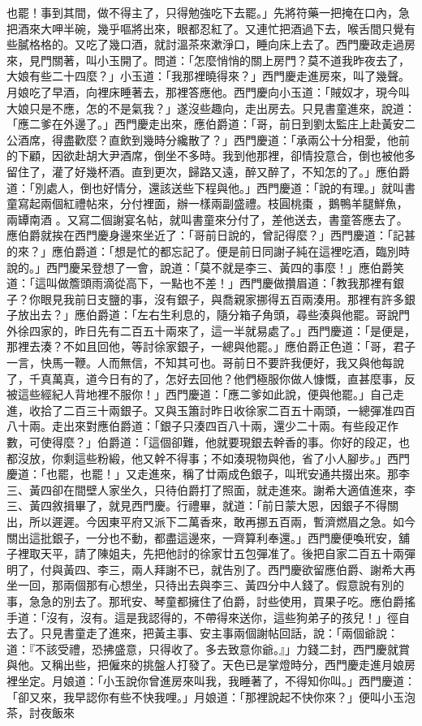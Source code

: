 \begin{showcontents}{}
也罷！事到其間，做不得主了，只得勉強吃下去罷。」先將符藥一把掩在口內，急把酒來大呷半碗，幾乎嘔將出來，眼都忍紅了。又連忙把酒過下去，喉舌間只覺有些膩格格的。又吃了幾口酒，就討溫茶來漱淨口，睡向床上去了。西門慶政走過房來，見門關著，叫小玉開了。問道：「怎麼悄悄的關上房門？莫不道我昨夜去了，大娘有些二十四麼？」小玉道：「我那裡曉得來？」西門慶走進房來，叫了幾聲。月娘吃了早酒，向裡床睡著去，那裡答應他。西門慶向小玉道：「賊奴才，現今叫大娘只是不應，怎的不是氣我？」遂沒些趣向，走出房去。只見書童進來，說道：「應二爹在外邊了。」西門慶走出來，應伯爵道：「哥，前日到劉太監庄上赴黃安二公酒席，得盡歡麼？直飲到幾時分纔散了？」西門慶道：「承兩公十分相愛，他前的下顧，因欲赴胡大尹酒席，倒坐不多時。我到他那裡，卻情投意合，倒也被他多留住了，灌了好幾杯酒。直到更次，歸路又遠，醉又醉了，不知怎的了。」應伯爵道：「別處人，倒也好情分，還該送些下程與他。」西門慶道：「說的有理。」就叫書童寫起兩個紅禮帖來，分付裡面，辦一樣兩副盛禮。枝圓桃棗 ，鵝鴨羊腿鮮魚，兩罈南酒 。又寫二個謝宴名帖，就叫書童來分付了，差他送去，書童答應去了。應伯爵就挨在西門慶身邊來坐近了：「哥前日說的，曾記得麼？」西門慶道：「記甚的來？」應伯爵道：「想是忙的都忘記了。便是前日同謝子純在這裡吃酒，臨別時說的。」西門慶呆登想了一會，說道：「莫不就是李三、黃四的事麼！」應伯爵笑道：「這叫做簷頭雨滴從高下，一點也不差！」西門慶做攢眉道：「教我那裡有銀子？你眼見我前日支鹽的事，沒有銀子，與喬親家挪得五百兩湊用。那裡有許多銀子放出去？」應伯爵道：「左右生利息的，隨分箱子角頭，尋些湊與他罷。哥說門外徐四家的，昨日先有二百五十兩來了，這一半就易處了。」西門慶道：「是便是，那裡去湊？不如且回他，等討徐家銀子，一總與他罷。」應伯爵正色道：「哥，君子一言，快馬一鞭。人而無信，不知其可也。哥前日不要許我便好，我又與他每說了，千真萬真，道今日有的了，怎好去回他？他們極服你做人慷慨，直甚麼事，反被這些經紀人背地裡不服你！」西門慶道：「應二爹如此說，便與他罷。」自己走進，收拾了二百三十兩銀子。又與玉簫討昨日收徐家二百五十兩頭，一總彈准四百八十兩。走出來對應伯爵道：「銀子只湊四百八十兩，還少二十兩。有些段疋作數，可使得麼？」伯爵道：「這個卻難，他就要現銀去幹香的事。你好的段疋，也都沒放，你剩這些粉緞，他又幹不得事；不如湊現物與他，省了小人腳步。」西門慶道：「也罷，也罷！」又走進來，稱了廿兩成色銀子，叫玳安通共掇出來。那李三、黃四卻在間壁人家坐久，只待伯爵打了照面，就走進來。謝希大適值進來，李三、黃四敘揖畢了，就見西門慶。行禮畢，就道：「前日蒙大恩，因銀子不得關出，所以遲遲。今因東平府又派下二萬香來，敢再挪五百兩，暫濟燃眉之急。如今關出這批銀子，一分也不動，都盡這邊來，一齊算利奉還。」西門慶便喚玳安，舖子裡取天平，請了陳姐夫，先把他討的徐家廿五包彈准了。後把自家二百五十兩彈明了，付與黃四、李三，兩人拜謝不已，就告別了。西門慶欲留應伯爵、謝希大再坐一回，那兩個那有心想坐，只待出去與李三、黃四分中人錢了。假意說有別的事，急急的別去了。那玳安、琴童都擁住了伯爵，討些使用，買果子吃。應伯爵搖手道：「沒有，沒有。這是我認得的，不帶得來送你，這些狗弟子的孩兒！」徑自去了。只見書童走了進來，把黃主事、安主事兩個謝帖回話，說：「兩個爺說：道：『不該受禮，恐拂盛意，只得收了。多去致意你爺。』」力錢二封，西門慶就賞與他。又稱出些，把僱來的挑盤人打發了。天色已是掌燈時分，西門慶走進月娘房裡坐定。月娘道：「小玉說你曾進房來叫我，我睡著了，不得知你叫。」西門慶道：「卻又來，我早認你有些不快我哩。」月娘道：「那裡說起不快你來？」便叫小玉泡茶，討夜飯來
\end{showcontents}
